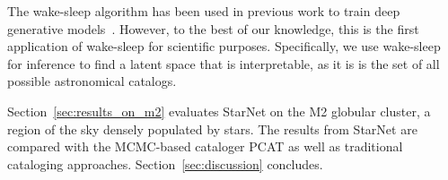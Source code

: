 The wake-sleep algorithm has been used in previous work to train deep generative models~\cite{Hinton1995wake_sleep, bornschein2014reweighted, le2018revisiting}.
However, to the best of our knowledge, this is the first application of wake-sleep for scientific purposes. 
Specifically, we use wake-sleep for inference to find a latent space that is interpretable, as it is is the set of all possible astronomical catalogs.

Section~\ref{sec:results_on_m2} evaluates StarNet on the M2 globular cluster, a region of the sky densely populated by stars. The results from StarNet are compared with the MCMC-based cataloger PCAT as well as traditional cataloging approaches. Section~\ref{sec:discussion} concludes. 




















